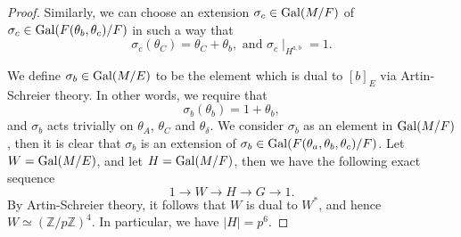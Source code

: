 \documentclass[12pt,leqno]{amsart}
\theoremstyle{plain}
\theoremstyle{definition}
\newcommand{\Z}{{\mathbb Z}}
\begin{document}
\begin{proof}
Similarly, we can choose an extension  $\sigma_c\in {\rm Gal}(M/F)$ of $\sigma_c\in {\rm Gal}(F(\theta_b,\theta_c)/F)$ in such a way that
\[
\sigma_c(\theta_{C})= \theta_{C}+\theta_{b}, \text{ and } \sigma_c\mid_{H^{a,b}}=1.
\]

We define $\sigma_b\in {\rm Gal}(M/E)$ to be the element which is dual to $[b]_E$ via Artin-Schreier theory. In other words, we require that
\[
\sigma_b(\theta_{b})=1+ \theta_{b},
\]
and $\sigma_b$ acts trivially on $\theta_{A}$, $\theta_{C}$ and $\theta_{\delta}$. We consider $\sigma_b$ as an element in ${\rm Gal}(M/F)$, then it is clear that $\sigma_b$ is an extension of $\sigma_b\in {\rm Gal}(F(\theta_{a},\theta_{b},\theta_{c})/F)$.
Let $W={\rm Gal}(M/E)$, and let $H={\rm Gal}(M/F)$, then we have the following exact sequence
\[
1\to W\to H\to G\to 1.
\]
By Artin-Schreier theory, it follows that $W$ is dual to $W^*$, and hence $W\simeq (\Z/p\Z)^4$. In particular, we have $|H|=p^6$.



\end{proof}
\end{document}
